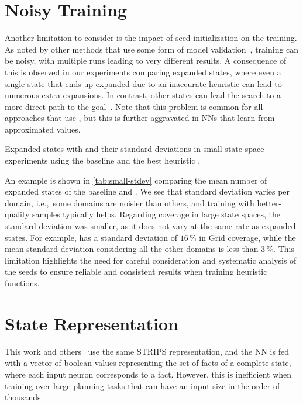 \section{Noisy Training}
\label{sec:noisy-training}

Another limitation to consider is the impact of seed initialization on the training. As noted by other methods that use some form of model validation~\cite{ferber2020neural, shen2020learning, ferber2022neural, otoole2022sampling}, training can be noisy, with multiple runs leading to very different results. A consequence of this is observed in our experiments comparing expanded states, where even a single state that ends up expanded due to an inaccurate heuristic can lead to numerous extra expansions. In contrast, other states can lead the search to a more direct path to the goal~\cite{heusner2017understanding}. Note that this problem is common for all approaches that use \gbfs, but this is further aggravated in NNs that learn from approximated values.

\begin{table}[ht]
    \caption[Expanded states with standard deviations in small state space experiments.]{Expanded states with \gbfs and their standard deviations in small state space experiments using the baseline \hnnbase and the best heuristic \hnnrs.}
    \label{tab:small-stdev}
    \addmargin
    \centering
    
\end{table}

An example is shown in \cref{tab:small-stdev} comparing the mean number of expanded states of the baseline and \hnnrs. We see that standard deviation varies per domain, i.e.,~some domains are noisier than others, and training with better-quality samples typically helps. Regarding coverage in large state spaces, the standard deviation was smaller, as it does not vary at the same rate as expanded states. For example, \hnnrs has a standard deviation of $16\,\%$ in Grid coverage, while the mean standard deviation considering all the other domains is less than $3\,\%$. This limitation highlights the need for careful consideration and systematic analysis of the seeds to ensure reliable and consistent results when training heuristic functions.

\section{State Representation}
\label{sec:limitation-representation}

This work and others~\cite{ferber2020neural, ferber2022neural, otoole2022sampling} use the same STRIPS representation, and the NN is fed with a vector of boolean values representing the set of facts of a complete state, where each input neuron corresponds to a fact. However, this is inefficient when training over large planning tasks that can have an input size in the order of thousands.

